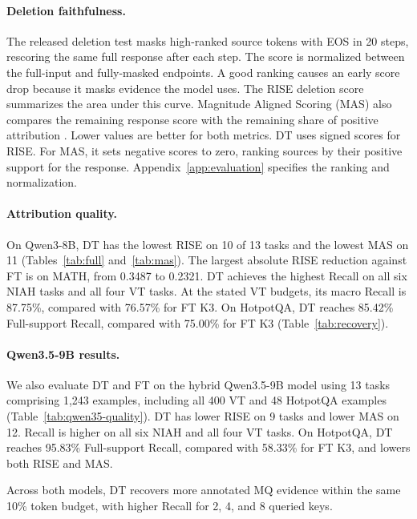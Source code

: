 \paragraph{Deletion faithfulness.}
The released deletion test masks high-ranked source tokens with EOS in 20 steps, rescoring the same full response after each step. The score is normalized between the full-input and fully-masked endpoints. A good ranking causes an early score drop because it masks evidence the model uses. The RISE deletion score summarizes the area under this curve. Magnitude Aligned Scoring (MAS) also compares the remaining response score with the remaining share of positive attribution \citep{pan2026flashtrace}. Lower values are better for both metrics. DT uses signed scores for RISE. For MAS, it sets negative scores to zero, ranking sources by their positive support for the response. Appendix~\ref{app:evaluation} specifies the ranking and normalization.



\paragraph{Attribution quality.}
On Qwen3-8B, DT has the lowest RISE on 10 of 13 tasks and the lowest MAS on 11 (Tables~\ref{tab:full} and~\ref{tab:mas}). The largest absolute RISE reduction against FT is on MATH, from 0.3487 to 0.2321. DT achieves the highest Recall on all six NIAH tasks and all four VT tasks. At the stated VT budgets, its macro Recall is 87.75\%, compared with 76.57\% for FT K3. On HotpotQA, DT reaches 85.42\% Full-support Recall, compared with 75.00\% for FT K3 (Table~\ref{tab:recovery}).



\paragraph{Qwen3.5-9B results.}
We also evaluate DT and FT on the hybrid Qwen3.5-9B model using 13 tasks comprising 1,243 examples, including all 400 VT and 48 HotpotQA examples (Table~\ref{tab:qwen35-quality}). DT has lower RISE on 9 tasks and lower MAS on 12. Recall is higher on all six NIAH and all four VT tasks. On HotpotQA, DT reaches 95.83\% Full-support Recall, compared with 58.33\% for FT K3, and lowers both RISE and MAS.

Across both models, DT recovers more annotated MQ evidence within the same 10\% token budget, with higher Recall for 2, 4, and 8 queried keys.

